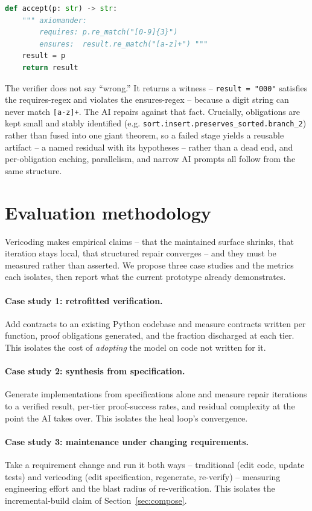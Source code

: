 \documentclass[sigconf,nonacm]{acmart}
\newcommand{\code}[1]{\texttt{#1}}
\begin{document}
\begin{lstlisting}[language=Python]
def accept(p: str) -> str:
    """ axiomander:
        requires: p.re_match("[0-9]{3}")
        ensures:  result.re_match("[a-z]+") """
    result = p
    return result
\end{lstlisting}

The verifier does not say ``wrong.'' It returns a witness -- \code{result =
"000"} satisfies the requires-regex and violates the ensures-regex -- because a
digit string can never match \code{[a-z]+}. The AI repairs against that fact.
Crucially, obligations are kept small and stably identified (e.g.
\code{sort.insert.preserves\_sorted.branch\_2}) rather than fused into one giant
theorem, so a failed stage yields a reusable artifact -- a named residual with
its hypotheses -- rather than a dead end, and per-obligation caching,
parallelism, and narrow AI prompts all follow from the same structure.

\section{Evaluation methodology}
\label{sec:eval}

Vericoding makes empirical claims -- that the maintained surface shrinks, that
iteration stays local, that structured repair converges -- and they must be
measured rather than asserted. We propose three case studies and the metrics
each isolates, then report what the current prototype already demonstrates.

\paragraph{Case study 1: retrofitted verification.} Add contracts to an existing
Python codebase and measure contracts written per function, proof obligations
generated, and the fraction discharged at each tier. This isolates the cost of
\emph{adopting} the model on code not written for it.

\paragraph{Case study 2: synthesis from specification.} Generate implementations
from specifications alone and measure repair iterations to a verified result,
per-tier proof-success rates, and residual complexity at the point the AI takes
over. This isolates the heal loop's convergence.

\paragraph{Case study 3: maintenance under changing requirements.} Take a
requirement change and run it both ways -- traditional (edit code, update tests)
and vericoding (edit specification, regenerate, re-verify) -- measuring
engineering effort and the blast radius of re-verification. This isolates the
incremental-build claim of Section~\ref{sec:compose}.
\end{document}
